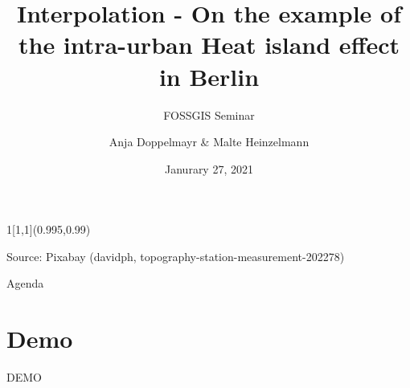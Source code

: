 \documentclass[aspectratio=169]{beamer}
\title{Interpolation - On the example of the intra-urban Heat island effect in Berlin}
\subtitle{FOSSGIS Seminar}
\date{Janurary 27, 2021}
\author{Anja Doppelmayr \& Malte Heinzelmann}
\institute{Ruprecht-Karls-Universit\"at Heidelberg}
\newlength\beamerleftmargin
\newenvironment*{env}{}{}
\begin{document}
	\begin{frame}[plain]
		\begin{textblock}{1}[1,1](0.995,0.99)
			\setlength\topsep{0pt}
			\begin{flushright}
				\tiny\color{text} Source: Pixabay (davidph, topography-station-measurement-202278)%
			\end{flushright}
		\end{textblock}
		\titlepage
	\end{frame}

	\begin{frame}{Agenda}
		\tableofcontents[]
	\end{frame}

	

	
	
	
	
	
	
	
	
	
	
	{
		\section{Demo}
		\begin{frame}[standout]
			\begin{env}
				\LARGE
				DEMO
			\end{env}
		\end{frame}
	}

	
	
\end{document}
